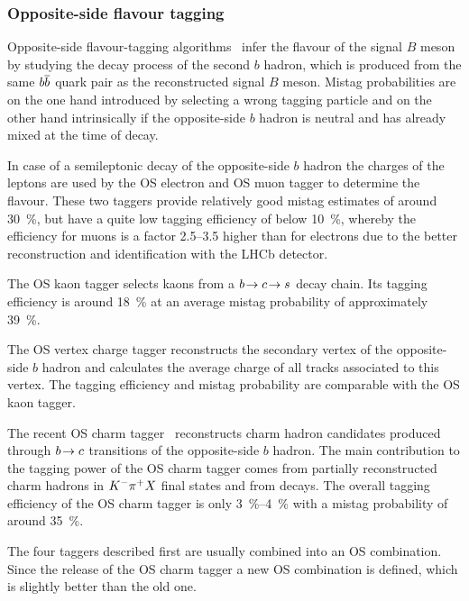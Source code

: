 
\subsubsection{Opposite-side flavour tagging}
\label{sec:detector:software:tagging:ostagging}

Opposite-side flavour-tagging algorithms~\cite{LHCb-PAPER-2011-027} infer the
flavour of the signal $B$ meson by studying the decay process of the second
$b$ hadron, which is produced from the same ${{b}{\overline {{b}}}}$ quark pair as the
reconstructed signal $B$ meson. Mistag probabilities are on the one hand
introduced by selecting a wrong tagging particle and on the other hand
intrinsically if the opposite-side $b$ hadron is neutral and has already mixed
at the time of decay.

In case of a semileptonic decay of the opposite-side $b$ hadron the charges of
the leptons are used by the OS electron and OS muon tagger to determine the
flavour. These two taggers provide relatively good mistag estimates of around
\SI{30}{\percent}, but have a quite low tagging efficiency of below
\SI{10}{\percent}, whereby the efficiency for muons is a factor
\numrange{2.5}{3.5} higher than for electrons due to the better reconstruction
and identification with the LHCb detector.

The OS kaon tagger selects kaons from a ${b}\!\rightarrow{\ensuremath{c}}\!\rightarrow{\ensuremath{s}}$
decay chain. Its tagging efficiency is around \SI{18}{\percent} at an average
mistag probability of approximately \SI{39}{\percent}.

The OS vertex charge tagger reconstructs the secondary vertex of the
opposite-side $b$ hadron and calculates the average charge of all tracks
associated to this vertex. The tagging efficiency and mistag probability are
comparable with the OS kaon tagger.

The recent OS charm tagger~\cite{LHCb-PAPER-2015-027} reconstructs charm
hadron candidates produced through ${b}\!\rightarrow{\ensuremath{c}}$ transitions of the
opposite-side $b$ hadron. The main contribution to the tagging power of the OS
charm tagger comes from partially reconstructed charm hadrons in ${{K}^-}{{\pi}^+} X$
final states and from \DzToKpi decays. The overall tagging efficiency of the
OS charm tagger is only \SIrange{3}{4}{\percent} with a mistag probability of
around \SI{35}{\percent}.

The four taggers described first are usually combined into an OS combination.
Since the release of the OS charm tagger a new OS combination is defined,
which is slightly better than the old one.